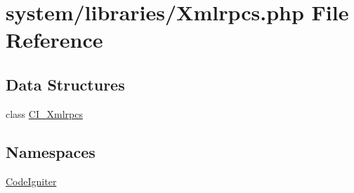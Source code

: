 \hypertarget{_xmlrpcs_8php}{}\section{system/libraries/\+Xmlrpcs.php File Reference}
\label{_xmlrpcs_8php}
\subsection*{Data Structures}
\begin{DoxyCompactItemize}
\item 
class \mbox{\hyperlink{class_c_i___xmlrpcs}{C\+I\+\_\+\+Xmlrpcs}}
\end{DoxyCompactItemize}
\subsection*{Namespaces}
\begin{DoxyCompactItemize}
\item 
 \mbox{\hyperlink{namespace_code_igniter}{Code\+Igniter}}
\end{DoxyCompactItemize}
